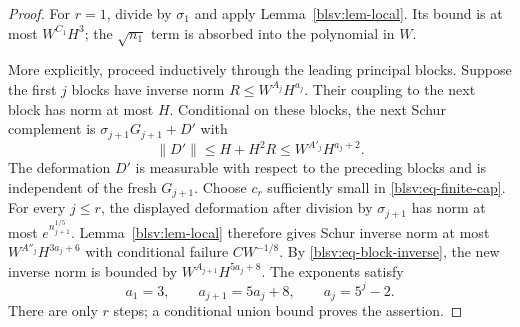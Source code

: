 \documentclass[11pt,reqno]{amsart}
\numberwithin{equation}{section}
\theoremstyle{plain}
\theoremstyle{definition}
\theoremstyle{remark}
\begin{document}
\begin{proof}
For $r=1$, divide by $\sigma_1$ and apply
Lemma~\ref{blsv:lem-local}. Its bound is at most $W^{C_1}H^3$;
the $\sqrt{n_1}$ term is absorbed into the polynomial in $W$.

More explicitly, proceed inductively through the leading principal
blocks. Suppose the first $j$ blocks have inverse norm
$R\le W^{A_j}H^{a_j}$. Their coupling to the next block has norm at most
$H$. Conditional on these blocks, the next Schur complement is
$\sigma_{j+1}G_{j+1}+D'$ with
\[
 \|D'\|\le H+H^2R\le W^{A'_j}H^{a_j+2}.
\]
The deformation $D'$ is measurable with respect to the preceding
blocks and is independent of the fresh $G_{j+1}$.
Choose $c_r$ sufficiently small in \eqref{blsv:eq-finite-cap}.
For every $j\le r$, the displayed deformation after division by
$\sigma_{j+1}$ has norm at most $e^{n_{j+1}^{1/5}}$.
Lemma~\ref{blsv:lem-local} therefore gives Schur inverse norm at most
$W^{A''_j}H^{3a_j+6}$ with conditional failure $CW^{-1/8}$.
By \eqref{blsv:eq-block-inverse}, the new inverse norm is bounded by
$W^{A_{j+1}}H^{5a_j+8}$. The exponents satisfy
\[
 a_1=3,\qquad a_{j+1}=5a_j+8,\qquad a_j=5^j-2.
\]
There are only $r$ steps; a conditional union bound proves the assertion.
\end{proof}
\end{document}
